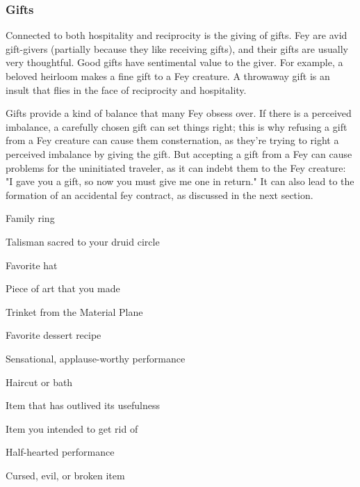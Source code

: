 \documentclass[10pt,a4paper,twoside,bg=print,twocolumn,openany,nodeprecatedcode]{dndbook}
\begin{document}
\subsubsection{Gifts}
Connected to both hospitality and reciprocity is the giving of gifts. Fey are avid gift-givers (partially because they like receiving gifts), and their gifts are usually very thoughtful. Good gifts have sentimental value to the giver. For example, a beloved heirloom makes a fine gift to a Fey creature. A throwaway gift is an insult that flies in the face of reciprocity and hospitality.

Gifts provide a kind of balance that many Fey obsess over. If there is a perceived imbalance, a carefully chosen gift can set things right; this is why refusing a gift from a Fey creature can cause them consternation, as they're trying to right a perceived imbalance by giving the gift. But accepting a gift from a Fey can cause problems for the uninitiated traveler, as it can indebt them to the Fey creature: "I gave you a gift, so now you must give me one in return." It can also lead to the formation of an accidental fey contract, as discussed in the next section.

{\par \vspace { 9pt plus 3pt minus 3pt } \noindent  {} \nopagebreak }

\begin{description}
\item Family ring
\item Talisman sacred to your druid circle
\item Favorite hat
\item Piece of art that you made
\item Trinket from the Material Plane
\item Favorite dessert recipe
\item Sensational, applause-worthy performance
\item Haircut or bath
\end{description}

{\par \vspace { 9pt plus 3pt minus 3pt } \noindent  {} \nopagebreak }

\begin{description}
\item Item that has outlived its usefulness
\item Item you intended to get rid of
\item Half-hearted performance
\item Cursed, evil, or broken item
\end{description}
\end{document}
